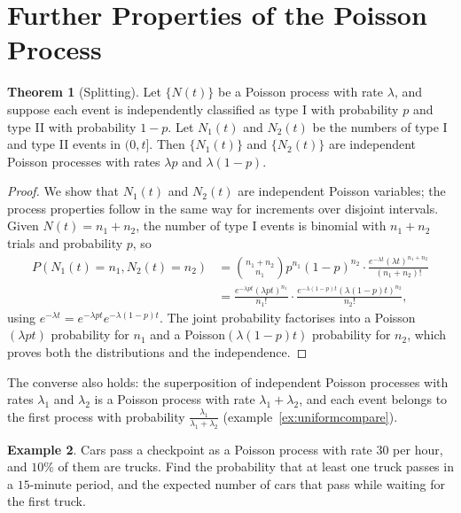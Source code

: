 \documentclass[12pt,a4paper]{report}
\theoremstyle{definition}
\newtheorem{thm}{Theorem}[section]
\newtheorem{exa}[thm]{Example}
\begin{document}
\section{Further Properties of the Poisson Process}

\begin{thm}[Splitting]
\label{thm:splitting}
Let $\{N(t)\}$ be a Poisson process with rate $\lambda$, and suppose each event is independently
classified as type I with probability $p$ and type II with probability $1 - p$. Let $N_1(t)$ and
$N_2(t)$ be the numbers of type I and type II events in $(0, t]$. Then $\{N_1(t)\}$ and $\{N_2(t)\}$
are independent Poisson processes with rates $\lambda p$ and $\lambda(1 - p)$.
\end{thm}

\begin{proof}
We show that $N_1(t)$ and $N_2(t)$ are independent Poisson variables; the process properties
follow in the same way for increments over disjoint intervals. Given $N(t) = n_1 + n_2$, the number
of type I events is binomial with $n_1 + n_2$ trials and probability $p$, so
\begin{align*}
P(N_1(t) = n_1, N_2(t) = n_2) &= \binom{n_1 + n_2}{n_1}p^{n_1}(1 - p)^{n_2}\cdot\frac{e^{-\lambda t}(\lambda t)^{n_1 + n_2}}{(n_1 + n_2)!}\\
&= \frac{e^{-\lambda pt}(\lambda pt)^{n_1}}{n_1!}\cdot\frac{e^{-\lambda(1 - p)t}(\lambda(1 - p)t)^{n_2}}{n_2!},
\end{align*}
using $e^{-\lambda t} = e^{-\lambda pt}e^{-\lambda(1 - p)t}$. The joint probability factorises into a
Poisson$(\lambda pt)$ probability for $n_1$ and a Poisson$(\lambda(1 - p)t)$ probability for $n_2$, which
proves both the distributions and the independence.
\end{proof}

The converse also holds: the superposition of independent Poisson processes with rates $\lambda_1$
and $\lambda_2$ is a Poisson process with rate $\lambda_1 + \lambda_2$, and each event belongs to the
first process with probability $\frac{\lambda_1}{\lambda_1 + \lambda_2}$ (example~\ref{ex:uniformcompare}).

\begin{exa}
\label{ex:splitting}
Cars pass a checkpoint as a Poisson process with rate $30$ per hour, and $10\%$ of them are trucks.
Find the probability that at least one truck passes in a $15$-minute period, and the expected
number of cars that pass while waiting for the first truck.
\end{exa}
\end{document}
